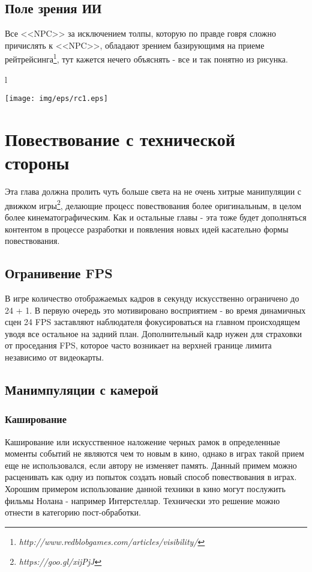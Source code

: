 \documentclass[11pt]{report}
\newenvironment{wrapfigure*}%
 {%
  \setlength{\columnsep}{15pt}%
  \wrapfloat{figure}}%
 {\endwrapfloat}
\begin{document}
\section{Поле зрения ИИ}
Все <<NPC>> за исключением толпы, которую по правде говря сложно причислять к <<NPC>>, обладают зрением базирующимя на приеме рейтрейсинга\footnote{\emph{http://www.redblobgames.com/articles/visibility/}}, тут кажется нечего объяснять - все и так понятно из рисунка.\\
\begin{wrapfigure*}{l}{\linewidth}
	\centering
	\begin{center}
		\texttt{[image: img/eps/rc1.eps]}
	\end{center}
\end{wrapfigure*}



\newpage
\chapter[Повествование с технической стороны]{Повествование с технической\\ стороны}
Эта глава должна пролить чуть больше света на не очень хитрые манипуляции с движком игры\footnote{\emph{https://goo.gl/xijPjJ}}, делающие процесс повествования более оригинальным, в целом более кинематографическим. Как и остальные главы - эта тоже будет дополняться контентом в процессе разработки и появления новых идей касательно формы повествования.
\newpage

\section{Огранивение FPS}
В игре количество отображаемых кадров в секунду искусственно ограничено до 24 + 1.
В первую очередь это мотивировано восприятием - во время динамичных сцен 24 FPS заставляют наблюдателя фокусироваться на главном происходящем уводя все остальное на задний план. Дополнительный кадр нужен для страховки от проседания FPS, которое часто возникает на верхней границе лимита независимо от видеокарты.\\

\section{Манимпуляции с камерой}
\subsection{Каширование}
Каширование или искусственное наложение черных рамок в определенные моменты событий не являются чем то новым в кино, однако в играх такой прием еще не использовался, если автору не изменяет память. Данный примем можно расценивать как одну из попыток создать новый способ повествования в играх. Хорошим примером использование данной техники в кино могут послужить фильмы Нолана - например Интерстеллар. Технически это решение можно отнести в категорию пост-обработки.
\end{document}
